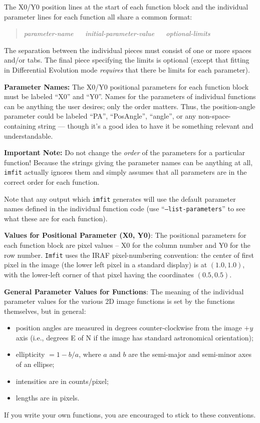 \documentclass[10pt]{article}
\newcommand{\imfit}{\texttt{imfit}}
\newcommand{\Imfit}{\texttt{Imfit}}
\begin{document}
The X0/Y0 position lines at the start of each function block and the
individual parameter lines for each function all share a common format:
\begin{quote}
\textit{parameter-name} ~~ \textit{initial-parameter-value} ~~ \textit{optional-limits}
\end{quote}
The separation between the individual pieces must consist of one or more spaces
and/or tabs. The final piece specifying the limits is optional (except that
fitting in Differential Evolution mode \textit{requires} that there be limits
for each parameter).

\bigskip

\textbf{Parameter Names:} The X0/Y0 positional parameters for each
function block must be labeled ``X0'' and ``Y0''. Names for the
parameters of individual functions can be anything the user desires;
only the order matters. Thus, the position-angle parameter could be
labeled ``PA'', ``PosAngle'', ``angle'', or any non-space-containing
string --- though it's a good idea to have it be something relevant
and understandable.

\textbf{Important Note:} Do not change the \textit{order} of the parameters
for a particular function!  Because the strings giving the parameter names
can be anything at all, \imfit{} actually ignores them and simply assumes
that all parameters are in the correct order for each function.

Note that any output which \imfit{} generates will use the default parameter
names defined in the individual function code (use ``\texttt{--list-parameters}''
to see what these are for each function).

\bigskip

\textbf{Values for Positional Parameter (X0, Y0)}: The positional parameters
for each function block are pixel values -- X0 for the column number and
Y0 for the row number. \Imfit{} uses the IRAF pixel-numbering
convention: the center of first pixel in the image (the lower left pixel
in a standard display) is at $(1.0,1.0)$, with the lower-left corner of that
pixel having the coordinates $(0.5,0.5)$.

\bigskip

\textbf{General Parameter Values for Functions}: The meaning of the individual
parameter values for the various 2D image functions is set by the functions
themselves, but in general: 
\begin{itemize}
\item position angles are measured in degrees counter-clockwise
from the image $+y$ axis (i.e., degrees E of N if the image has standard
astronomical orientation);
\item ellipticity $= 1 - b/a$, where $a$ and $b$ are the
semi-major and semi-minor axes of an ellipse;
\item intensities are in counts/pixel;
\item lengths are in pixels. 
\end{itemize}
If you write your own functions, you are encouraged
to stick to these conventions.
\end{document}
